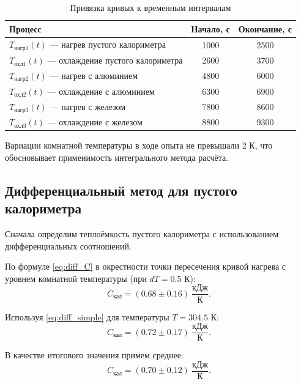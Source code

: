 \documentclass[a4paper,12pt]{article}
\begin{document}
\begin{table}[H]
    \centering
    \begin{tabular}{|l|c|c|}
        \hline
        \textbf{Процесс} & \textbf{Начало, с} & \textbf{Окончание, с} \\
        \hline
        $T_{\text{нагр1}}(t)$ — нагрев пустого калориметра & 1000 & 2500 \\
        $T_{\text{охл1}}(t)$ — охлаждение пустого калориметра & 2600 & 3700 \\
        $T_{\text{нагр2}}(t)$ — нагрев с алюминием & 4800 & 6000 \\
        $T_{\text{охл2}}(t)$ — охлаждение с алюминием & 6300 & 6900 \\
        $T_{\text{нагр3}}(t)$ — нагрев с железом & 7800 & 8600 \\
        $T_{\text{охл3}}(t)$ — охлаждение с железом & 8800 & 9300 \\
        \hline
    \end{tabular}
    \caption{Привязка кривых к временным интервалам}
    \label{tab:times}
\end{table}

Вариации комнатной температуры в ходе опыта не превышали 2 К, что обосновывает применимость интегрального метода расчёта.

\subsection{Дифференциальный метод для пустого калориметра}
Сначала определим теплоёмкость пустого калориметра с использованием дифференциальных соотношений.

По формуле \eqref{eq:diff_C} в окрестности точки пересечения кривой нагрева с уровнем комнатной температуры (при $dT = 0.5$ К):
\begin{equation}
    C_{\text{кал}} = (0.68 \pm 0.16) \ \frac{\text{кДж}}{\text{К}}.
\end{equation}

Используя \eqref{eq:diff_simple} для температуры $T = 304.5$ К:
\begin{equation}
    C_{\text{кал}} = (0.72 \pm 0.17) \ \frac{\text{кДж}}{\text{К}}.
\end{equation}

В качестве итогового значения примем среднее:
\begin{equation}
    C_{\text{кал}} = (0.70 \pm 0.12) \ \frac{\text{кДж}}{\text{К}}.
\end{equation}
\end{document}
